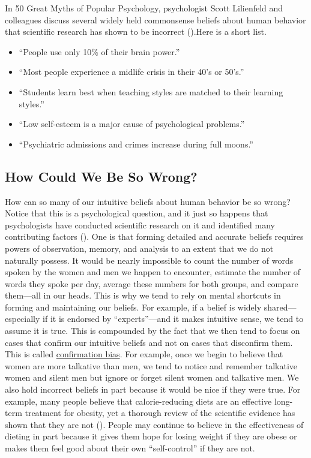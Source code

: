 \documentclass[
]{krantz}
\providecommand{\tightlist}{%
  \setlength{\itemsep}{0pt}\setlength{\parskip}{0pt}}
\begin{document}
In 50 Great Myths of Popular Psychology, psychologist Scott Lilienfeld and colleagues discuss several widely held commonsense beliefs about human behavior that scientific research has shown to be incorrect ().Here is a short list.

\begin{itemize}
\tightlist
\item
  ``People use only 10\% of their brain power.''
\item
  ``Most people experience a midlife crisis in their 40's or 50's.''
\item
  ``Students learn best when teaching styles are matched to their learning styles.''
\item
  ``Low self-esteem is a major cause of psychological problems.''
\item
  ``Psychiatric admissions and crimes increase during full moons.''
\end{itemize}

\subsection*{How Could We Be So Wrong?}\label{how-could-we-be-so-wrong}


How can so many of our intuitive beliefs about human behavior be so wrong? Notice that this is a psychological question, and it just so happens that psychologists have conducted scientific research on it and identified many contributing factors (). One is that forming detailed and accurate beliefs requires powers of observation, memory, and analysis to an extent that we do not naturally possess. It would be nearly impossible to count the number of words spoken by the women and men we happen to encounter, estimate the number of words they spoke per day, average these numbers for both groups, and compare them---all in our heads. This is why we tend to rely on mental shortcuts in forming and maintaining our beliefs. For example, if a belief is widely shared---especially if it is endorsed by ``experts''---and it makes intuitive sense, we tend to assume it is true. This is compounded by the fact that we then tend to focus on cases that confirm our intuitive beliefs and not on cases that disconfirm them. This is called \hyperref[confirmation-bias]{confirmation bias}. For example, once we begin to believe that women are more talkative than men, we tend to notice and remember talkative women and silent men but ignore or forget silent women and talkative men. We also hold incorrect beliefs in part because it would be nice if they were true. For example, many people believe that calorie-reducing diets are an effective long-term treatment for obesity, yet a thorough review of the scientific evidence has shown that they are not (). People may continue to believe in the effectiveness of dieting in part because it gives them hope for losing weight if they are obese or makes them feel good about their own ``self-control'' if they are not.
\end{document}

